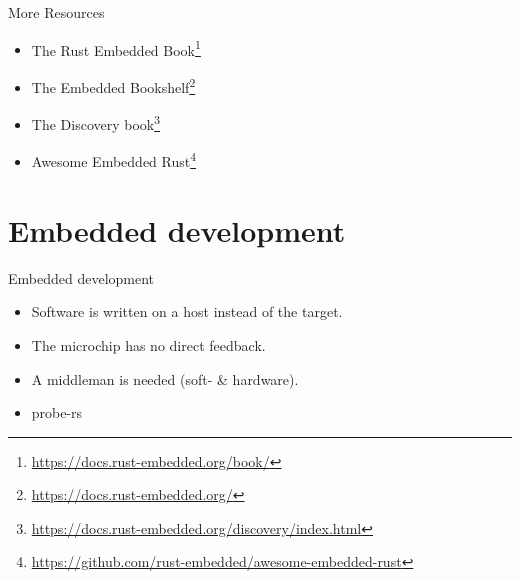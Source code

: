 \documentclass[aspectratio=1610,14pt,t]{beamer}
\begin{document}
\begin{frame}[c]{More Resources}
  \begin{itemize}
    \item The Rust Embedded Book\footnote{\url{https://docs.rust-embedded.org/book/}}
    \item The Embedded Bookshelf\footnote{\url{https://docs.rust-embedded.org/}}
    \item The Discovery book\footnote{\url{https://docs.rust-embedded.org/discovery/index.html}}
    \item Awesome Embedded Rust\footnote{\url{https://github.com/rust-embedded/awesome-embedded-rust}}
  \end{itemize}
\end{frame}

\section{Embedded development}

\begin{frame}[c]{Embedded development}
  \begin{itemize}
    \item Software is written on a host instead of the target.
    \item The microchip has no direct feedback.
    \item A middleman is needed (soft- \& hardware).
    \item probe-rs
  \end{itemize}
\end{frame}
\end{document}
